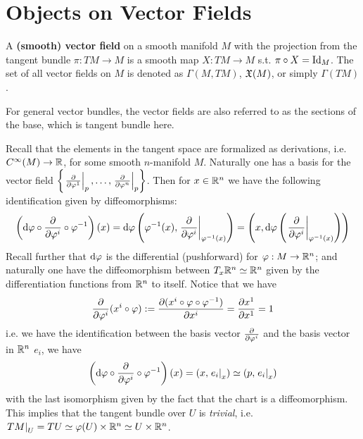 \documentclass{article}
\begin{document}

\tableofcontents
\newpage

\section{Objects on Vector Fields}

\begin{definition}
    A \textbf{(smooth) vector field} on a smooth manifold $M$ with the projection from the tangent bundle $\pi: TM \to M$ is a smooth map $X: TM \to M$ s.t. $\pi \circ X = \mathrm{Id}_M$. The set of all vector fields on $M$ is denoted as $\Gamma(M, TM)$, $\mathfrak{X}(M)$, or simply $\Gamma(TM)$.
\end{definition}

For general vector bundles, the vector fields are also referred to as the sections of the base, which is tangent bundle here.

\begin{example}\label{ex: tangent bundle is trivial}
    Recall that the elements in the tangent space are formalized as derivations, i.e. $C^{\infty}(M) \to \mathbb{R}$, for some smooth $n$-manifold $M$. Naturally one has a basis for the vector field $\left\{ \left.{\frac{\partial}{\partial \varphi^1}}\right|_{p}, \dots, \left.{\frac{\partial}{\partial \varphi^n}}\right|_{p} \right\}$. Then for $x \in \mathbb{R}^n$ we have the following identification given by diffeomorphisms:
    \[
        \left( \mathrm{d}\varphi \circ \frac{\partial}{\partial \varphi^i} \circ \varphi^{-1} \right)(x)
        = \mathrm{d}\varphi\left( \varphi^{-1}(x), \left.\frac{\partial}{\partial \varphi^i}\right|_{\varphi^{-1}(x)} \right)
        = \left(x, \mathrm{d}\varphi\left( \left.\frac{\partial}{\partial \varphi^i}\right|_{\varphi^{-1}(x)} \right) \right)
    \]
    Recall further that $\mathrm{d}\varphi$ is the differential (pushforward) for $\varphi: M \to \mathbb{R}^n$; and naturally one have the diffeomorphism between $T_x\mathbb{R}^n \simeq \mathbb{R}^n$ given by the differentiation functions from $\mathbb{R}^n$ to itself. Notice that we have
    \[
        \frac{\partial}{\partial \varphi^i}(x^i \circ \varphi) := \frac{\partial (x^i \circ \varphi \circ \varphi^{-1})}{\partial x^i} = \frac{\partial x^1}{\partial x^1} = 1
    \]
    i.e. we have the identification between the basis vector $\frac{\partial}{\partial \varphi^i}$ and the basis vector in $\mathbb{R}^n$ $e_i$, we have 
    \[
        \left( \mathrm{d}\varphi \circ \frac{\partial}{\partial \varphi^i} \circ \varphi^{-1} \right)(x) = (x, \left.e_i\right|_{x}) \simeq (p, \left.e_i\right|_{x})
    \]
    with the last isomorphism given by the fact that the chart is a diffeomorphism. This implies that the tangent bundle over $U$ is \emph{trivial}, i.e. $\left.TM\right|_{U} = TU \simeq \varphi(U) \times \mathbb{R}^n \simeq U \times \mathbb{R}^n$. 
\end{example}
\end{document}
